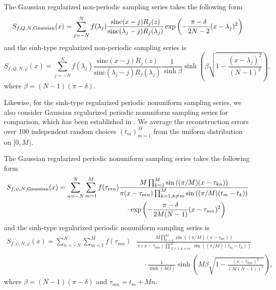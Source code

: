 \documentclass[a4paper]{article}
\numberwithin{equation}{section}
\begin{document}
The Gaussian regularized non-periodic sampling series  takes the following form 
\begin{equation}
\label{gaussianformula}  
S_{f,Q,N,{\rm Gaussian}}(x)=\sum_{j=-N}^{N}f(\lambda_j)\frac{\text{sinc} (x-j)R_{j}(z)}{\text{sinc}(\lambda_j -j)R_{j}(\lambda_{j})}\exp{\left(-\frac{\pi-\delta}{2N-2}(x-\lambda_j)^2\right)}
\end{equation}
and  the sinh-type regularized non-periodic sampling series is
\begin{equation}
\label{sinhformula}    
S_{f,Q,N,\varphi}(x)=\sum_{j=-N}^{N}f(\lambda_j)\frac{\text{sinc} (x-j)R_{j}(z)}{\text{sinc}(\lambda_j -j)R_{j}(\lambda_{j})}\frac{1}{\sinh \beta} \sinh\left(\beta \sqrt{1 - \frac{(x-\lambda_j)^2}{(N-1)^2}}\right),
\end{equation}
where $\beta=(N-1)(\pi-\delta)$.

Likewise, for the sinh-type regularized periodic nonuniform sampling series, we also consider Gaussian regularized periodic nonuniform sampling series for comparison, which has been established in \cite{wang2019gaussian,asharabi2023periodic,asharabi2024modification}. We average the reconstruction errors over 100 independent random choices $(t_{m})_{m=1}^{M}$ from the uniform distribution on $[0,M)$.

 
The Gaussian regularized periodic nonuniform sampling series takes the following form
\begin{equation}
\label{periodicgaussianformula}  
\begin{aligned}
S_{f,\psi,N,{\rm Gaussian}}(x)= \sum_{n=-N}^{N} \sum_{m=1}^{M}  f(\tau_{mn}) &
\frac{M \prod_{k=1}^{M} \sin\left((\pi/M)(x - \tau_{kn})\right)}{\pi(x - \tau_{mn}) \prod_{\substack{k=1,k \neq m}}^{M} \sin\left((\pi/M)(t_m - t_k)\right)} \\
&\quad  \cdot  \exp{\left(-\frac{\pi-\delta}{2M(N-1)}(x-\tau_{mn})^2\right)}
\end{aligned}
\end{equation}
and   the sinh-type regularized periodic nonuniform sampling series is
\begin{equation}
\label{periodicsinhformula}  
\begin{aligned}
S_{f,\psi,N,\varphi}(x)= \sum_{n=-N}^{N} \sum_{m=1}^{M}  f(\tau_{mn}) &
\frac{M \prod_{k=1}^{M} \sin\left((\pi/M)(x - \tau_{kn})\right)}{\pi(x - \tau_{mn}) \prod_{\substack{k=1,k \neq m}}^{M} \sin\left((\pi/M)(t_m - t_k)\right)} \\
&\quad  \cdot    \frac{1}{\sinh (M\beta )} \sinh\left(M\beta  \sqrt{1 - \frac{(x-\tau_{mn})^2}{(M(N-1))^2}}\right),
\end{aligned}
\end{equation}
where $\beta=(N-1)(\pi-\delta)$ and $\tau_{mn} = t_m + Mn$. 
\end{document}
